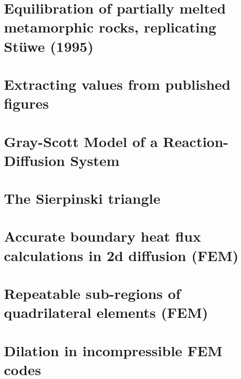 \documentclass[a4paper,11pt]{report}
\begin{document}
\chapter{Equilibration of partially melted metamorphic rocks, replicating St{\"u}we (1995) \label{f169}} %

\chapter{Extracting values from published figures \label{f170}} %

\chapter{Gray-Scott Model of a Reaction-Diffusion System \label{f171}} %

\chapter{The Sierpinski triangle \label{f172}} %

\chapter{Accurate boundary heat flux calculations in 2d diffusion (FEM) \label{f173}} %

\chapter{Repeatable sub-regions of quadrilateral elements (FEM) \label{f174}} %

\chapter{Dilation in incompressible FEM codes \label{f175}} %
\end{document}
